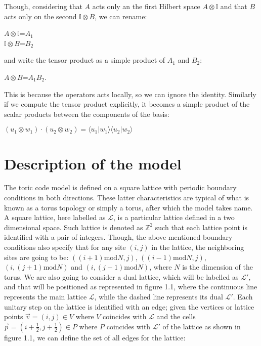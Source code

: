 \documentclass{Configuration_Files/PoliMi3i_thesis}
\begin{document}
Though, considering that $A$ acts only an the first Hilbert space $A \otimes \mathbb{I}$ and that $B$ acts only on the second $\mathbb{I} \otimes B$, we can rename:

\begin{center}
	$A \otimes \mathbb{I}$=$A_1$ \\
	$\mathbb{I} \otimes B$=$B_2$
\end{center}

and write the tensor product as a simple product of $A_1$ and $B_2$:

\begin{center}
	$A \otimes B$=$A_1$$B_2$.
\end{center}

This is because the operators acts locally, so we can ignore the identity. \newline
Similarly if we compute the tensor product explicitly, it becomes a simple product of the scalar products between the components of the basis:

\begin{center}
	$(u_1 \otimes w_1) \cdot (u_2 \otimes w_2) = \langle u_1 | w_1 \rangle \langle u_2 | w_2 \rangle$
\end{center}








\newpage
\section{Description of the model}
\label{sec:Model}

The toric code model is defined on a square lattice with periodic boundary conditions in both directions. These latter characteristics are typical of what is known as a torus topology or simply a torus, after which the model takes name.\newline
A square lattice, here labelled as $\mathcal{L}$, is a particular lattice defined in a two dimensional space. Such lattice is denoted as $\mathbb{Z}^{2}$ such that each lattice point is identified with a pair of integers. Though, the above mentioned boundary conditions also specify that for any site $(i, j)$ in the lattice, the neighboring sites are going to be: $((i+1)\mathrm{mod}N, j)$, $((i-1)\mathrm{mod} N, j)$, $(i, (j+1)\mathrm{mod}N)$ and $(i, (j-1)\mathrm{mod}N)$, where $N$ is the dimension of the torus. We are also going to consider a dual lattice, which will be labelled as $\mathcal{L}'$, and that will be positioned as represented in figure 1.1, where the continuous line represents the main lattice $\mathcal{L}$, while the dashed line represents its dual $\mathcal{L'}$.  \newline	
Each unitary step on the lattice is identified with an edge; given the vertices or lattice points $\vec{v}=(i,j) \in V$ where $V$ coincides with $\mathcal{L}$ and the cells $\vec{p}=(i+\frac{1}{2},j+\frac{1}{2})\in P$ where $P$ coincides with $ \mathcal{L'}$ of the lattice as shown in figure 1.1, we can define the set of all edges for the lattice:
\end{document}
